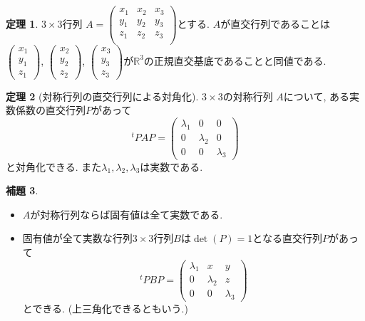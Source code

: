 \documentclass[dvipdfmx,a4paper,11pt]{article}
\newcommand{\R}{\mathbb{R}}
\theoremstyle{definition}
\newtheorem{thm}{定理}
\newtheorem{lem}[thm]{補題}
\begin{document}
 
 
 \begin{tcolorbox}[
    colback = white,
    colframe = green!35!black,
    fonttitle = \bfseries,
    breakable = true]
    \begin{thm}
$3 \times 3$行列
$
A=\begin{pmatrix}
x_1&x_2&x_3\\  
y_1&y_2&y_3\\ 
z_1&z_2&z_3\\
\end{pmatrix}
$とする.
$A$が直交行列であることは
$
\begin{pmatrix}
 x_1 \\
y_1 \\
z_1
\end{pmatrix}
$,
$
\begin{pmatrix}
 x_2 \\
y_2\\
z_2
\end{pmatrix}
$, $
\begin{pmatrix}
 x_3 \\
y_3 \\
z_3
\end{pmatrix}
$が$\R^3$の正規直交基底であることと同値である.
\end{thm}
 \end{tcolorbox}
 
 

  \begin{tcolorbox}[
    colback = white,
    colframe = green!35!black,
    fonttitle = \bfseries,
    breakable = true]
    \begin{thm}[対称行列の直交行列による対角化]
$3 \times 3$の対称行列
$A$について, ある実数係数の直交行列$P$があって
$$
{}^tP A P=
\begin{pmatrix}
\lambda_1& 0 &0\\
0& \lambda_2 &0\\
0 & 0& \lambda_3
\end{pmatrix}
$$
と対角化できる. また$\lambda_1,\lambda_2, \lambda_3$は実数である. 
  \end{thm}
 \end{tcolorbox}
 
 
 
 
  \begin{tcolorbox}[
    colback = white,
    colframe = green!35!black,
    fonttitle = \bfseries,
    breakable = true]
    \begin{lem}
\begin{itemize}
\setlength{\parskip}{0cm}
 \setlength{\itemsep}{0pt} 
\item $A$が対称行列ならば固有値は全て実数である.
\item 固有値が全て実数な行列$3 \times 3$行列$B$は$\det(P)=1$となる直交行列$P$があって
$$
{}^tP BP=
\begin{pmatrix}
\lambda_1& x &y \\
0& \lambda_2 & z\\
0 & 0& \lambda_3
\end{pmatrix}
$$
とできる. (上三角化できるともいう.)
\end{itemize}
\end{lem}
 \end{tcolorbox}
 
\end{document}
